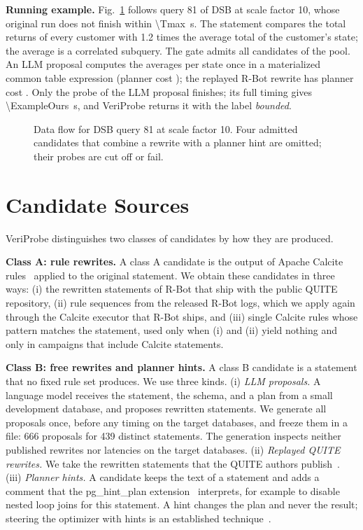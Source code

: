 \documentclass[conference]{IEEEtran}
\newcommand{\sys}{VeriProbe}
\begin{document}
\textbf{Running example.}
Fig.~\ref{fig:example} follows query 81 of DSB at scale factor 10, whose original run does not finish within \SI{\Tmax}{\second}.
The statement compares the total returns of every customer with 1.2 times the average total of the customer's state; the average is a correlated subquery.
The gate admits all \ExamplePool{} candidates of the pool.
An LLM proposal computes the averages per state once in a materialized common table expression (planner cost \ExampleMacroCost{}); the replayed R-Bot rewrite has planner cost \ExampleRuleCost{}.
Only the probe of the LLM proposal finishes; its full timing gives \SI{\ExampleOurs}{\second}, and \sys{} returns it with the label \emph{bounded}.

\begin{figure}[t]
  \centering
  
  \caption{Data flow for DSB query 81 at scale factor 10. Four admitted candidates that combine a rewrite with a planner hint are omitted; their probes are cut off or fail.}
  \label{fig:example}
\end{figure}

\section{Candidate Sources}
\label{sec:sources}

\sys{} distinguishes two classes of candidates by how they are produced.

\textbf{Class A: rule rewrites.}
A class A candidate is the output of Apache Calcite rules~\cite{begoli2018} applied to the original statement.
We obtain these candidates in three ways: (i) the rewritten statements of R-Bot that ship with the public QUITE repository, (ii) rule sequences from the released R-Bot logs, which we apply again through the Calcite executor that R-Bot ships, and (iii) single Calcite rules whose pattern matches the statement, used only when (i) and (ii) yield nothing and only in campaigns that include Calcite statements.

\textbf{Class B: free rewrites and planner hints.}
A class B candidate is a statement that no fixed rule set produces.
We use three kinds.
(i) \emph{LLM proposals.} A language model receives the statement, the schema, and a plan from a small development database, and proposes rewritten statements. We generate all proposals once, before any timing on the target databases, and freeze them in a file: 666 proposals for 439 distinct statements. The generation inspects neither published rewrites nor latencies on the target databases.
(ii) \emph{Replayed QUITE rewrites.} We take the rewritten statements that the QUITE authors publish~\cite{song2025}.
(iii) \emph{Planner hints.} A candidate keeps the text of a statement and adds a comment that the pg\_hint\_plan extension~\cite{pghintplan} interprets, for example to disable nested loop joins for this statement. A hint changes the plan and never the result; steering the optimizer with hints is an established technique~\cite{marcus2021}.
\end{document}

